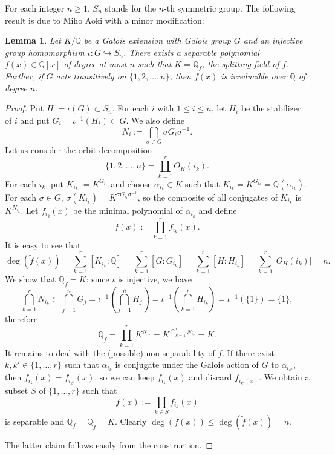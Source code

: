 \documentclass{amsart}
\newtheorem{lemma}[theorem]{Lemma}
\theoremstyle{definition}
\newcommand{\Q}{\mathbb{Q}}
\renewcommand{\ge}{\geqslant}
\renewcommand{\le}{\leqslant}
\begin{document}
For each integer $n\ge 1$, $S_n$ stands for the $n$-th symmetric group.
The following result is due to Miho Aoki with a minor modification:
\begin{lemma}\label{poly}Let $K/\Q$ be a Galois extension with Galois group $G$
  and an injective group homomorphism $\iota:G\hookrightarrow S_n$.
  There exists a separable polynomial $f(x)\in\Q[x]$ of degree at most $n$
  such that $K=\Q_f$, the splitting field of $f$. Further, if $G$ acts transitively on $\{1,2,\ldots,n\}$, then $f(x)$ is irreducible over $\Q$ of degree $n$.
\end{lemma}
\begin{proof}Put $H:=\iota(G)\subset S_n$.
  For each $i$ with $1\le i\le n$, let $H_i$ be the stabilizer of $i$ and put
  $G_i=\iota^{-1}(H_i)\subset G$. We also define
  \begin{equation*}
    N_i:=\bigcap_{\sigma\in G}\sigma G_i \sigma^{-1}.
  \end{equation*}
  Let us consider the orbit decomposition
  \begin{equation*}
    \{1,2,\ldots,n\}=\coprod_{k=1}^r O_H(i_k).
  \end{equation*}
  For each $i_k$,
  put $K_{i_k}:=K^{G_{i_k}}$ and choose $\alpha_{i_k}\in K$ such that
  $K_{i_k}=K^{G_{i_k}}=\Q(\alpha_{i_k})$. For each $\sigma \in G$, $\sigma(K_{i_k})=
    K^{\sigma G_{i_k}\sigma^{-1}}$, so the composite of all conjugates of $K_{i_k}$
  is $K^{N_{i_k}}$.
  Let $f_{i_k}(x)$ be the minimal polynomial of $\alpha_{i_k}$ and define
  \begin{equation}\label{g(x)}
    \widetilde{f}(x):=\prod_{k=1}^r f_{i_k}(x).
  \end{equation}
  It is easy to see that
  \begin{equation*}
    \deg(\widetilde{f}(x))=\sum_{k=1}^r[K_{i_k}:\Q]=\sum_{k=1}^r[G:G_{i_k}]=\sum_{k=1}^r[H:H_{i_k}]=
    \sum_{k=1}^r|O_H(i_k)|=n.
  \end{equation*}
  We show that $\Q_{\widetilde{f}}=K$: since $\iota$ is injective, we have
  \begin{equation*}
    \bigcap_{k=1}^r N_{i_k}\subset \bigcap_{j=1}^n G_{j}=\iota^{-1}(\bigcap_{j=1}^n H_j)
    =\iota^{-1}(\bigcap_{k=1}^r H_{i_k})=\iota^{-1}(\{1\})=\{1\},
  \end{equation*}
  therefore
  \begin{equation*}
    \Q_{\widetilde{f}}=\prod_{k=1}^r K^{N_{i_k}}=K^{\bigcap_{k=1}^r N_{i_k}}=K.
  \end{equation*}
  It remains to deal with the (possible) non-separability of $\widetilde{f}$.
  If there exist $k,k'\in\{1,\dots,r\}$ such that $\alpha_{i_k}$ is conjugate under the Galois action of $G$ to $\alpha_{i_{k'}}$, then $f_{i_k}(x)=f_{i_{k'}}(x)$, so we can keep $f_{i_k}(x)$ and discard $f_{i_{k'}(x)}$.
  We obtain a subset $S$ of $\{1,\ldots, r\}$ such that
  \begin{equation*}
    f(x):=\prod_{k\in S}f_{i_k}(x)
  \end{equation*}
  is separable and $\Q_f=\Q_{\widetilde{f}}=K$. Clearly
  $\deg(f(x))\le \deg(\widetilde{f}(x))=n$.

  The latter claim follows easily from the construction.
\end{proof}
\end{document}
